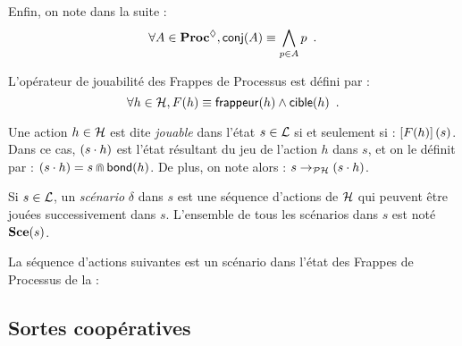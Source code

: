 Enfin, on note dans la suite :
\[\forall A \in \mathbf{Proc}^{\lozenge}, \mathsf{conj}(A) \equiv \bigwedge_{p \in A} p \enspace.\]


\begin{definition}
  L'opérateur de jouabilité des Frappes de Processus est défini par :
  \[\forall h \in \mathcal{H}, F(h) \equiv \mathsf{frappeur}(h) \wedge \mathsf{cible}(h) \enspace.\]
\end{definition}

\begin{definition}
  Une action $h \in \mathcal{H}$ est dite \emph{jouable}
  dans l'état $s \in \mathcal{L}$ si et seulement si :
  $\left[F(h)\right](s)$.
  Dans ce cas, $(s \cdot h)$ est l'état résultant du jeu de l'action $h$ dans $s$,
  et on le définit par : $(s \cdot h) = s \Cap \mathsf{bond}(h)$.
  De plus, on note alors : $s \rightarrow_{\mathcal{PH}} (s \cdot h)$.

  Si $s \in \mathcal{L}$, un \emph{scénario} $\delta$ dans $s$
  est une séquence d'actions de $\mathcal{H}$ qui peuvent être jouées successivement dans $s$.
  L'ensemble de tous les scénarios dans $s$ est noté $\mathbf{Sce}(s)$.
\end{definition}

\begin{example}
  La séquence d'actions suivantes est un scénario dans l'état \TODO des Frappes de Processus
  de la  :
  \TODO
\end{example}



\subsection{Sortes coopératives}

\TODO



